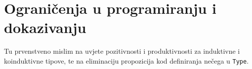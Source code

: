 
\section{Ograničenja u programiranju i dokazivanju}\label{sec:ogranicenja}
Tu prvenstveno mislim na uvjete pozitivnosti i produktivnosti za induktivne i koinduktivne tipove,
te na eliminaciju propozicija kod definiranja nečega u \texttt{Type}.

